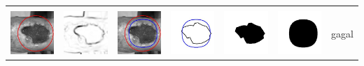 \begin{table}[H]
\begin{tabular}{|m{0.7in}|m{0.7in}|m{0.7in}|m{0.7in}|m{0.7in}|m{0.7in}|m{0.7in}|}
		&  &  & & & &  \\
		\includegraphics[width=0.7in]{dataset/dataset_3/luka_merah/ready/33_integer_init.jpg}&
		\includegraphics[width=0.7in]{dataset/dataset_3/luka_merah/ready/33_integer_ext.jpg}&
		\includegraphics[width=0.7in]{dataset/dataset_3/luka_merah/ready/33_integer_result.jpg}&
		\includegraphics[width=0.7in]{dataset/dataset_3/luka_merah/ready/33_gt_r_integer.jpg}&
		\includegraphics[width=0.7in]{dataset/dataset_3/luka_merah/ready/33_r.jpg}&
		\includegraphics[width=0.7in]{dataset/dataset_3/luka_merah/ready/33_integer_r.jpg}&
		gagal\\
		\hline
		

\end{tabular}
\end{table}
